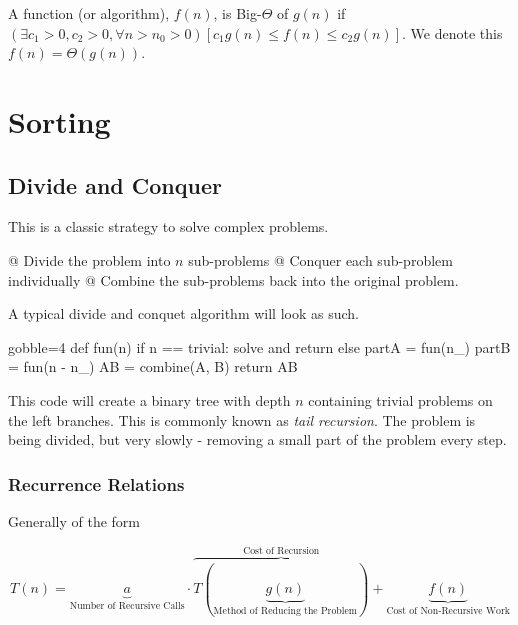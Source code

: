 \documentclass[10pt]{article}
\begin{document}
    \begin{thm}
        A function (or algorithm), $f(n)$, is Big-$\Theta$ of $g(n)$ if $ (\exists c_1 > 0, c_2 > 0, \forall n > n_0 > 0)[c_1 g(n) \le f(n) \le c_2 g(n)] $. We denote this $f(n) = \Theta(g(n))$.
    \end{thm}

\section{Sorting}
    \subsection{Divide and Conquer}

    This is a classic strategy to solve complex problems.

    \NewList
    \begin{easylist}[enumerate]
        @ Divide the problem into $n$ sub-problems
        @ Conquer each sub-problem individually
        @ Combine the sub-problems back into the original problem.
    \end{easylist}

    A typical divide and conquet algorithm will look as such.

    \begin{pythoncode*}{gobble=4}
        def fun(n)
            if n == trivial:
                solve and return
            else
                partA = fun(n_)
                partB = fun(n - n_)
                AB    = combine(A, B)
                return AB
    \end{pythoncode*}

    This code will create a binary tree with depth $n$ containing trivial problems on the left branches. This is commonly known as \textit{tail recursion}. The problem is being divided, but very slowly - removing a small part of the problem every step.

        \subsubsection{Recurrence Relations}
        Generally of the form

            \[ T(n) = \underbrace{a}_{\text{Number of Recursive Calls}} \cdot
                        \overbrace{T(\underbrace{g(n)}_{\text{Method of Reducing the Problem}})}^{\text{Cost of Recursion}} +
                        \underbrace{f(n)}_{\text{Cost of Non-Recursive Work}} \]
\end{document}
